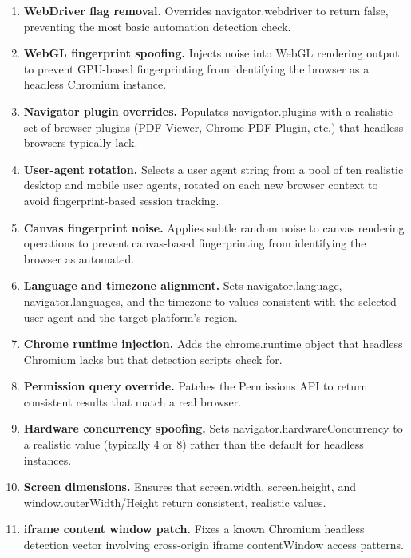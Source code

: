 \documentclass[12pt,a4paper,oneside]{report}
\renewcommand{\texttt}[1]{%
  {\ttfamily\hyphenchar\font=45\relax #1}}
\begin{document}
\begin{enumerate}[leftmargin=*]
  \item \textbf{WebDriver flag removal.} Overrides
        \texttt{navigator.webdriver} to return \texttt{false}, preventing
        the most basic automation detection check.
  \item \textbf{WebGL fingerprint spoofing.} Injects noise into WebGL
        rendering output to prevent GPU-based fingerprinting from
        identifying the browser as a headless Chromium instance.
  \item \textbf{Navigator plugin overrides.} Populates
        \texttt{navigator.plugins} with a realistic set of browser plugins
        (PDF Viewer, Chrome PDF Plugin, etc.) that headless browsers
        typically lack.
  \item \textbf{User-agent rotation.} Selects a user agent string from a
        pool of ten realistic desktop and mobile user agents, rotated on
        each new browser context to avoid fingerprint-based session
        tracking.
  \item \textbf{Canvas fingerprint noise.} Applies subtle random noise to
        canvas rendering operations to prevent canvas-based fingerprinting
        from identifying the browser as automated.
  \item \textbf{Language and timezone alignment.} Sets
        \texttt{navigator.language}, \texttt{navigator.languages}, and
        the timezone to values consistent with the selected user agent and
        the target platform's region.
  \item \textbf{Chrome runtime injection.} Adds the
        \texttt{chrome.runtime} object that headless Chromium lacks but
        that detection scripts check for.
  \item \textbf{Permission query override.} Patches the Permissions API
        to return consistent results that match a real browser.
  \item \textbf{Hardware concurrency spoofing.} Sets
        \texttt{navigator.hardwareConcurrency} to a realistic value
        (typically 4 or 8) rather than the default for headless instances.
  \item \textbf{Screen dimensions.} Ensures that \texttt{screen.width},
        \texttt{screen.height}, and \texttt{window.outerWidth/Height}
        return consistent, realistic values.
  \item \textbf{iframe content window patch.} Fixes a known Chromium
        headless detection vector involving cross-origin iframe
        contentWindow access patterns.
\end{enumerate}
\end{document}
